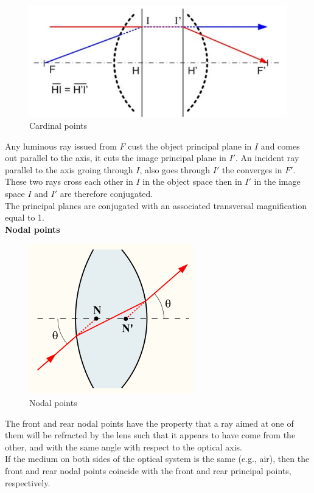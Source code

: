 \documentclass[../main.tex]{subfiles}
\begin{document}
	\begin{figure}[h!]
		\centering
		\includegraphics[scale=0.8]{../graphics/Geometrical_optics12.png}
		\caption{Cardinal points}
		\label{fig:Cardinal}
	\end{figure}
	\FloatBarrier
	Any luminous ray issued from $F$ cust the object principal plane in $I$ and comes out parallel to the axis, it cuts the image principal plane in $I'$. An incident ray parallel to the axis groing through $I$, also goes through $I'$ the converges in $F'$. These two rays cross each other in $I$ in the object space then in $I'$ in the image space $I$ and $I'$ are therefore conjugated.\\
	The principal planes are conjugated with an associated transversal magnification equal to 1.\\
	\textbf{Nodal points}\\
	\begin{figure}[h!]
		\centering
		\includegraphics[scale=0.8]{../graphics/Geometrical_optics16.png}
		\caption{Nodal points}
		\label{fig:Nodal points}
	\end{figure}
	\FloatBarrier
	The front and rear nodal points have the property that a ray aimed at one of them will be refracted by the lens such that it appears to have come from the other, and with the same angle with respect to the optical axis. \\
	If the medium on both sides of the optical system is the same (e.g., air), then the front and rear nodal points coincide with the front and rear principal points, respectively.
\end{document}

